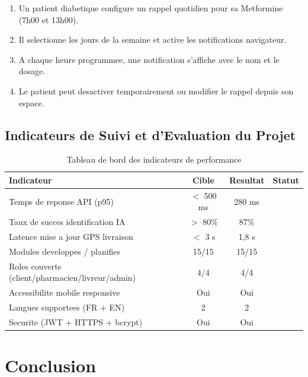 \documentclass[12pt,a4paper]{report}
\newcommand{\cmark}{\textcolor{vertpharma}{\checkmark}}
\begin{document}
\begin{enumerate}[label=\textbf{Etape \arabic*.},leftmargin=*]
    \item Un patient diabetique configure un rappel quotidien pour sa Metformine (7h00 et 13h00).
    \item Il selectionne les jours de la semaine et active les notifications navigateur.
    \item A chaque heure programmee, une notification s'affiche avec le nom et le dosage.
    \item Le patient peut desactiver temporairement ou modifier le rappel depuis son espace.
\end{enumerate}

\section{Indicateurs de Suivi et d'Evaluation du Projet}

\begin{table}[ht]
\centering
\caption{Tableau de bord des indicateurs de performance}
\renewcommand{\arraystretch}{1.5}
\begin{tabularx}{\textwidth}{|X|c|c|c|}
\hline
\rowcolor{vertpharma!20}
\textbf{Indicateur} & \textbf{Cible} & \textbf{Resultat} & \textbf{Statut} \\ \hline
Temps de reponse API (p95) & $<$ 500 ms & 280 ms & \cmark \\ \hline
Taux de succes identification IA & $>$ 80\% & 87\% & \cmark \\ \hline
Latence mise a jour GPS livraison & $<$ 3 s & 1,8 s & \cmark \\ \hline
Modules developpes / planifies & 15/15 & 15/15 & \cmark \\ \hline
Roles couverts (client/pharmacien/livreur/admin) & 4/4 & 4/4 & \cmark \\ \hline
Accessibilite mobile responsive & Oui & Oui & \cmark \\ \hline
Langues supportees (FR + EN) & 2 & 2 & \cmark \\ \hline
Securite (JWT + HTTPS + bcrypt) & Oui & Oui & \cmark \\ \hline
\end{tabularx}
\end{table}

\chapter*{Conclusion}
\end{document}
